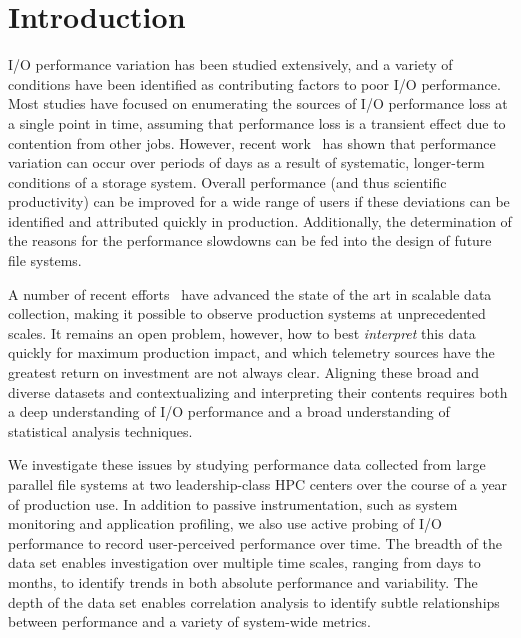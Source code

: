 \section{Introduction}

I/O performance variation has been studied extensively, and a variety of conditions have been identified as contributing factors to poor I/O performance.  Most studies have focused on enumerating the sources of I/O performance loss at a single point in time, assuming that performance loss is a transient effect due to contention from other jobs.  However, recent work~\cite{Lockwood2017} has shown that performance variation can occur over periods of days as a result of systematic, longer-term conditions of a storage system.
%
Overall performance (and thus scientific productivity) can be improved for a
wide range of users if these deviations can be identified and attributed
quickly in production. Additionally, the determination of the reasons for the performance slowdowns can be fed into the design of future file systems. 


A number of recent efforts~\cite{Lockwood2017,Vazhkudai2017guide,Agelastos2014ldms,Kunkel2014siox} have advanced the
state of the art in scalable data collection, making it possible to observe
production systems at unprecedented scales.  It remains an open problem,
however, how to best \emph{interpret} this data quickly for maximum production
impact, and which telemetry sources have the greatest return on
investment are not always clear.
Aligning these broad and diverse datasets and contextualizing and interpreting their contents requires both a deep understanding of I/O performance and a broad understanding of statistical analysis techniques.

We investigate these issues by studying performance data collected
from large parallel file systems at two leadership-class HPC centers
over the course of a year of production use.  In addition to passive
instrumentation, such as system monitoring and application profiling,
we also use active probing of I/O performance to record user-perceived
performance over time.  The breadth of the data set enables investigation
over multiple time scales, ranging from days to months, to identify trends in
both absolute performance and variability.  The depth of the data set
enables correlation analysis to identify subtle relationships between
performance and a variety of system-wide metrics.

